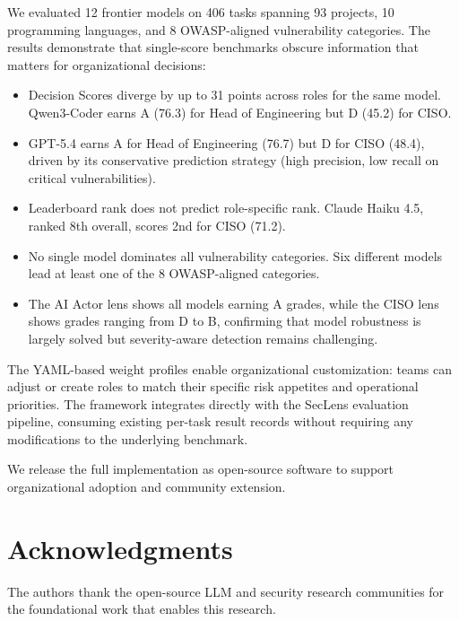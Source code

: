 \documentclass[10pt,twocolumn]{article}
\newcommand{\seclens}{SecLens\xspace}
\begin{document}
We evaluated 12 frontier models on 406 tasks spanning 93 projects, 10 programming languages, and 8 OWASP-aligned vulnerability categories. The results demonstrate that single-score benchmarks obscure information that matters for organizational decisions:

\begin{itemize}[noitemsep,topsep=2pt]
    \item Decision Scores diverge by up to 31 points across roles for the same model. Qwen3-Coder earns A (76.3) for Head of Engineering but D (45.2) for CISO.
    \item GPT-5.4 earns A for Head of Engineering (76.7) but D for CISO (48.4), driven by its conservative prediction strategy (high precision, low recall on critical vulnerabilities).
    \item Leaderboard rank does not predict role-specific rank. Claude Haiku 4.5, ranked 8th overall, scores 2nd for CISO (71.2).
    \item No single model dominates all vulnerability categories. Six different models lead at least one of the 8 OWASP-aligned categories.
    \item The AI Actor lens shows all models earning A grades, while the CISO lens shows grades ranging from D to B, confirming that model robustness is largely solved but severity-aware detection remains challenging.
\end{itemize}

The YAML-based weight profiles enable organizational customization: teams can adjust or create roles to match their specific risk appetites and operational priorities. The framework integrates directly with the \seclens evaluation pipeline, consuming existing per-task result records without requiring any modifications to the underlying benchmark.

We release the full implementation as open-source software to support organizational adoption and community extension.

\section*{Acknowledgments}

The authors thank the open-source LLM and security research communities for the foundational work that enables this research.


\end{document}
